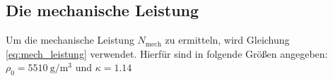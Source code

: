 \subsection[]{Die mechanische Leistung}
Um die mechanische Leistung $N_\text{mech}$ zu ermitteln, wird Gleichung \eqref{eq:mech_leistung} verwendet.
Hierfür sind in \cite[]{man:v206} folgende Größen angegeben: $\rho_\text{0} = \qty[]{5510}{\gram\per\cubic\meter}$ 
und $\kappa = \num[]{1.14}$